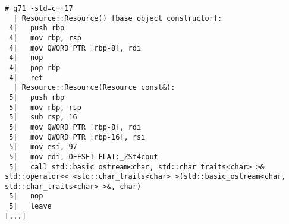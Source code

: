 \begin{lstlisting}[language={},numbers=none,title=\href{https://godbolt.org/z/YF3jpV}{\texttt{godbolt.org/z/YF3jpV}}]
# g71 -std=c++17
  | Resource::Resource() [base object constructor]:
 4|   push rbp
 4|   mov rbp, rsp
 4|   mov QWORD PTR [rbp-8], rdi
 4|   nop
 4|   pop rbp
 4|   ret
  | Resource::Resource(Resource const&):
 5|   push rbp
 5|   mov rbp, rsp
 5|   sub rsp, 16
 5|   mov QWORD PTR [rbp-8], rdi
 5|   mov QWORD PTR [rbp-16], rsi
 5|   mov esi, 97
 5|   mov edi, OFFSET FLAT:_ZSt4cout
 5|   call std::basic_ostream<char, std::char_traits<char> >& std::operator<< <std::char_traits<char> >(std::basic_ostream<char, std::char_traits<char> >&, char)
 5|   nop
 5|   leave
[...]
\end{lstlisting}
